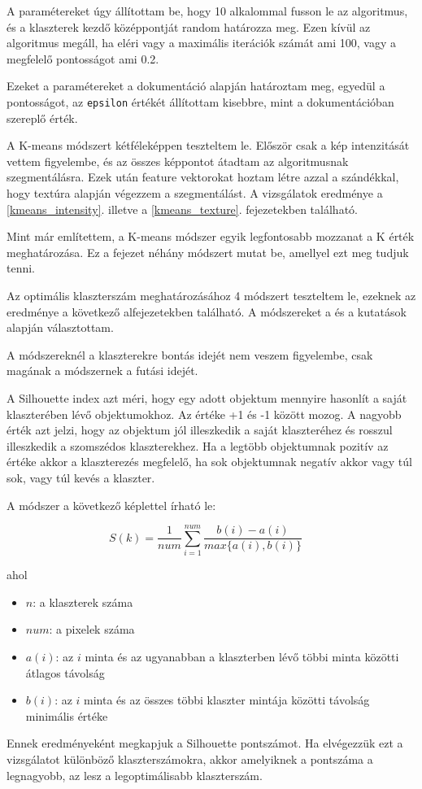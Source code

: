 A paramétereket úgy állítottam be, hogy 10 alkalommal fusson le az algoritmus, és a klaszterek kezdő középpontját random határozza meg. Ezen kívül az algoritmus megáll, ha eléri vagy a maximális iterációk számát ami 100, vagy a megfelelő pontosságot ami 0.2.

Ezeket a paramétereket a \cite{kmeans_opencv} dokumentáció alapján határoztam meg, egyedül a pontosságot, az \texttt{epsilon} értékét állítottam kisebbre, mint a dokumentációban szereplő érték.

A K-means módszert kétféleképpen teszteltem le. Először csak a kép intenzitását vettem figyelembe, és az összes képpontot átadtam az algoritmusnak szegmentálásra. Ezek után feature vektorokat hoztam létre azzal a szándékkal, hogy textúra alapján végezzem a szegmentálást. A vizsgálatok eredménye a \ref{kmeans_intensity}. illetve a \ref{kmeans_texture}. fejezetekben található.

 \label{optimal_cluster_number}
Mint már említettem, a K-means módszer egyik legfontosabb mozzanat a K érték meghatározása. Ez a fejezet néhány módszert mutat be, amellyel ezt meg tudjuk tenni.

Az optimális klaszterszám meghatározásához 4 módszert teszteltem le, ezeknek az eredménye a következő alfejezetekben található.
A módszereket a \cite{tomatoleaf} és a \cite{elbow} kutatások alapján választottam.

A módszereknél a klaszterekre bontás idejét nem veszem figyelembe, csak magának a módszernek a futási idejét.


A Silhouette index azt méri, hogy egy adott objektum mennyire hasonlít a saját klaszterében lévő objektumokhoz. Az értéke +1 és -1 között mozog. A nagyobb érték azt jelzi, hogy az objektum jól illeszkedik a saját klaszteréhez és rosszul illeszkedik a szomszédos klaszterekhez. Ha a legtöbb objektumnak pozitív az értéke akkor a klaszterezés megfelelő, ha sok objektumnak negatív akkor vagy túl sok, vagy túl kevés a klaszter.

A módszer a következő képlettel írható le:

\[ S(k)=\frac{1}{num} \sum_{i=1}^{num} \frac{b(i)-a(i)}{max\{a(i),b(i)\}} \quad \]

\noindent ahol
\begin{itemize}
\item $n$: a klaszterek száma
\item $num$: a pixelek száma
\item $a(i)$: az $i$ minta és az ugyanabban a klaszterben lévő többi minta közötti átlagos távolság
\item $b(i)$: az $i$ minta és az összes többi klaszter mintája közötti távolság minimális értéke
\end{itemize}
Ennek eredményeként megkapjuk a Silhouette pontszámot. Ha elvégezzük ezt a vizsgálatot különböző klaszterszámokra, akkor amelyiknek a pontszáma a legnagyobb, az lesz a legoptimálisabb klaszterszám. \cite{tomatoleaf}

